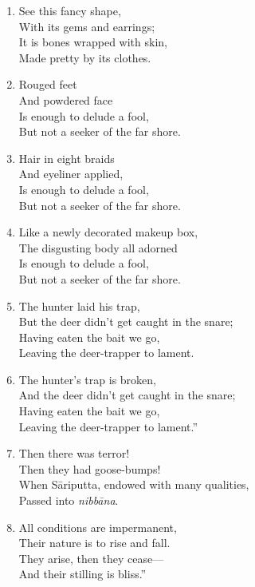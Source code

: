 \documentclass[10pt, openany]{book}
\newcommand*{\vleftofline}[1]{\leavevmode\llap{#1}}
\begin{document}
\begin{enumerate}
\item See this fancy shape,\\
With its gems and earrings;\\
It is bones wrapped with skin,\\
Made pretty by its clothes.

\item Rouged feet\\
And powdered face\\
Is enough to delude a fool,\\
But not a seeker of the far shore.

\item Hair in eight braids\\
And eyeliner applied,\\
Is enough to delude a fool,\\
But not a seeker of the far shore.

\item Like a newly decorated makeup box,\\
The disgusting body all adorned\\
 Is enough to delude a fool,\\
But not a seeker of the far shore.

\item The hunter laid his trap,\\
But the deer didn’t get caught in the snare;\\
Having eaten the bait we go,\\
Leaving the deer-trapper to lament.

\item The hunter’s trap is broken,\\
And the deer didn’t get caught in the snare;\\
Having eaten the bait we go,\\
Leaving the deer-trapper to lament.”

\item \vleftofline{“}Then there was terror!\\
Then they had goose-bumps!\\
When Sāriputta, endowed with many qualities,\\
Passed into \emph{nibbāna}.

\item All conditions are impermanent,\\
Their nature is to rise and fall.\\
They arise, then they cease—\\
And their stilling is bliss.”


\end{enumerate}
\end{document}
